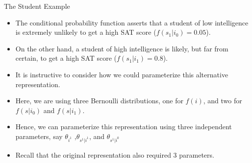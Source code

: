\documentclass[handout]{beamer}
\begin{document}
\begin{frame}{The Student Example}
\scriptsize{
\begin{itemize}

\item The conditional probability function asserts that a student of low intelligence is extremely unlikely to get a high SAT score ($f(s_1 | i_0 ) = 0.05$).
\item On the other hand, a student of high intelligence is likely, but far from
certain, to get a high SAT score ($f(s_1 | i_1 ) = 0.8$).

\item It is instructive to consider how we could parameterize this alternative representation. 
\item Here, we are using three Bernoulli distributions, one for $f(i)$, and two for $f(s | i_0)$ and $f(s|i_1)$.
\item Hence, we can parameterize this representation using three independent parameters, say $\theta_{i^1}$ ,$\theta_{s^1|i^1}$, and $\theta_{s^1|i^0}$

\item Recall that the original representation also required 3 parameters.



\end{itemize}



} 

\end{frame}
\end{document}
